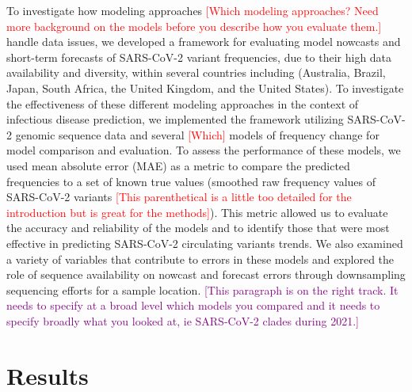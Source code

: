\documentclass[11pt,oneside,letterpaper]{article}
\def\jhc#1{\textcolor{red}{[#1]}}
\def\tbc#1{\textcolor{purple}{[#1]}}
\begin{document}
To investigate how modeling approaches \jhc{Which modeling approaches? Need more background on the models before you describe how you evaluate them.} handle data issues, we developed a framework for evaluating model nowcasts and short-term forecasts of SARS-CoV-2 variant frequencies, due to their high data availability and diversity, within several countries including (Australia, Brazil, Japan, South Africa, the United Kingdom, and the United States).
To investigate the effectiveness of these different modeling approaches in the context of infectious disease prediction, we implemented the framework utilizing SARS-CoV-2 genomic sequence data and several \jhc{Which} models of frequency change for model comparison and evaluation.
To assess the performance of these models, we used mean absolute error (MAE) as a metric to compare the predicted frequencies to a set of known true values (smoothed raw frequency values of SARS-CoV-2 variants \jhc{This parenthetical is a little too detailed for the introduction but is great for the methods}). %
This metric allowed us to evaluate the accuracy and reliability of the models and to identify those that were most effective in predicting SARS-CoV-2 circulating variants trends.
We also examined a variety of variables that contribute to errors in these models and explored the role of sequence availability on nowcast and forecast errors through downsampling sequencing efforts for a sample location.
\tbc{This paragraph is on the right track. It needs to specify at a broad level which models you compared and it needs to specify broadly what you looked at, ie SARS-CoV-2 clades during 2021.}

\section*{Results}
\end{document}
